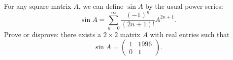 For any square matrix $A$, we can define $\sin A$ by the usual power
series:
\[
\sin A = \sum_{n=0}^\infty \frac{(-1)^n}{(2n+1)!} A^{2n+1}.
\]
Prove or disprove: there exists a $2 \times 2$ matrix $A$ with real
entries such that
\[
\sin A = \left( \begin{array}{cc} 1 & 1996 \\ 0 & 1 \end{array} \right).
\]
